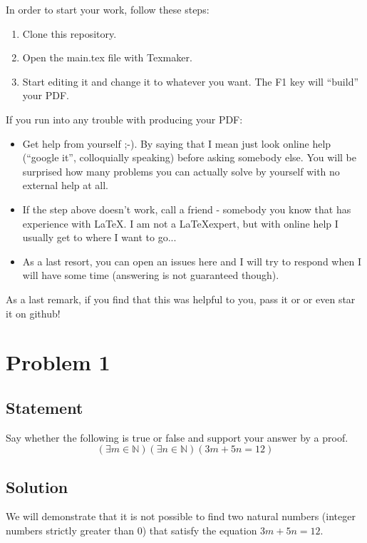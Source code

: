 \documentclass[12pt,letter]{memoir}
\newcommand{\code}[1]{\codefont#1\normalfont}
\begin{document}
In order to start your work, follow these steps:
\begin{enumerate}
\item Clone this repository.
\item Open the \code{main.tex} file with Texmaker.
\item Start editing it and change it to whatever you want. The \code{F1} key will ``build'' your PDF.
\end{enumerate}

If you run into any trouble with producing your PDF:
\begin{itemize}
\item Get help from yourself ;-). By saying that I mean just look online help (``google it'', colloquially speaking) before asking somebody else. You will be surprised how many problems you can actually solve by yourself with no external help at all.
\item If the step above doesn't work, call a friend - somebody you know that has experience with \LaTeX. I am not a \LaTeX expert, but with online help I usually get to where I want to go...
\item As a last resort, you can open an issues here and I will try to respond when I will have some time (answering is not guaranteed though).
\end{itemize}

As a last remark, if you find that this was helpful to you, pass it or or even star it on github!

\chapter{Problem 1}
\section*{Statement}
Say whether the following is true or false and support your answer by a proof.
\begin{equation}\label{prob1}
(\exists m \in \mathbb{N})(\exists n \in \mathbb{N})(3m+5n=12)
\end{equation}
\section*{Solution}
We will demonstrate that it is not possible to find two natural numbers (integer numbers strictly greater than $0$) that satisfy the equation $3m+5n=12$.
\end{document}
